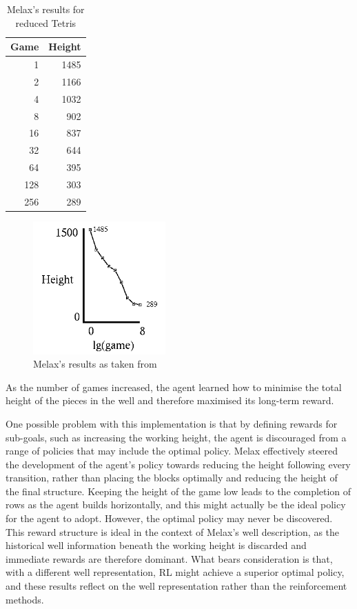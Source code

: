\documentclass{rucsthesis}
\begin{document}
\begin{table}[h]
\centering
\begin{tabular}{|r|r|}
\hline
Game & Height  \\
\hline
    1 &  1485 \\
     2  & 1166 \\
     4  & 1032 \\
     8  &  902 \\
    16  &  837 \\
    32  &  644 \\
    64  &  395 \\
   128  &  303 \\
   256   & 289 \\
\hline
\end{tabular}
\caption{Melax's results for reduced Tetris}
\label{mresults}
\end{table}

\begin{figure}[h]
\centering
\includegraphics[width=2in]{melaxresults.png}
\caption{Melax's results as taken from \cite{melaxtetris}}
\label{fig:meres}
\end{figure}

As the number of games increased, the agent learned how to minimise the total height of the pieces in the well and therefore maximised its long-term reward.

One possible problem with this implementation is that by defining rewards for sub-goals, such as increasing the working height, the agent is discouraged from a range of policies that may include the optimal policy.  Melax effectively steered the development of the agent's policy towards reducing the height following every transition, rather than placing the blocks optimally and reducing the height of the final structure. Keeping the height of the game low leads to the completion of rows as the agent builds horizontally, and this might actually be the ideal policy for the agent to adopt. However, the optimal policy may never be discovered. This reward structure is ideal in the context of Melax's well description, as the historical well information beneath the working height is discarded and immediate rewards are therefore dominant. What bears consideration is that, with a different well representation, RL might achieve a superior optimal policy, and these results reflect on the well representation rather than the reinforcement methods.
\end{document}
